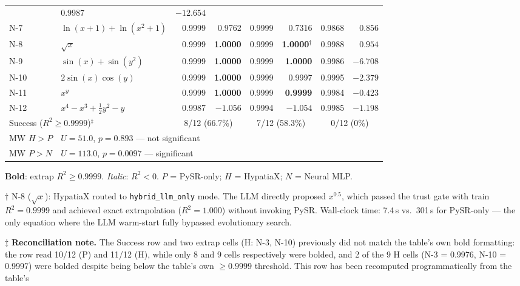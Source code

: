 \documentclass[twoside,11pt]{article}
\newcommand{\Rsq}{R^{2}}
\begin{document}
\begin{table}[h]
\begin{threeparttable}
\begin{tabular}{llrrrrrr}
  & 0.9987 & $-12.654$ \\
N-7  & $\ln(x+1)+\ln(x^2+1)$
  & 0.9999 & 0.9762
  & 0.9999 & 0.7316
  & 0.9868 & $0.856$ \\
N-8  & $\sqrt{x}$
  & 0.9999 & \textbf{1.0000}
  & 0.9999 & \textbf{1.0000}$^\dag$
  & 0.9988 & $0.954$ \\
N-9  & $\sin(x)+\sin(y^2)$
  & 0.9999 & \textbf{1.0000}
  & 0.9999 & \textbf{1.0000}
  & 0.9986 & $-6.708$ \\
N-10 & $2\sin(x)\cos(y)$
  & 0.9999 & \textbf{1.0000}
  & 0.9999 & 0.9997
  & 0.9995 & $-2.379$ \\
N-11 & $x^y$
  & 0.9999 & \textbf{1.0000}
  & 0.9999 & \textbf{0.9999}
  & 0.9984 & $-0.423$ \\
N-12 & $x^4 - x^3 + \tfrac{1}{2}y^2 - y$
  & 0.9987 & $-1.056$
  & 0.9994 & $-1.054$
  & 0.9985 & $-1.198$ \\
\midrule
\multicolumn{2}{l}{Success ($\Rsq\ge0.9999$)$^\ddag$}
  & \multicolumn{2}{c}{8/12 (66.7\%)}
  & \multicolumn{2}{c}{7/12 (58.3\%)}
  & \multicolumn{2}{c}{0/12 (0\%)} \\
MW $H>P$   & \multicolumn{7}{l}{$U=51.0$, $p=0.893$ — not significant} \\
MW $P>N$   & \multicolumn{7}{l}{$U=113.0$, $p=0.0097$ — significant} \\
\bottomrule
\end{tabular}
\begin{tablenotes}\small
  \item \textbf{Bold}: extrap $\Rsq \ge 0.9999$. \emph{Italic}: $\Rsq < 0$.
    $P$ = PySR-only; $H$ = HypatiaX; $N$ = Neural MLP.
  \item[$\dag$] N-8 ($\sqrt{x}$): HypatiaX routed to \texttt{hybrid\_llm\_only} mode.
    The LLM directly proposed $x^{0.5}$, which passed the trust gate with
    train $\Rsq = 0.9999$ and achieved exact extrapolation ($\Rsq = 1.000$)
    without invoking PySR. Wall-clock time: 7.4\,s vs.\ 301\,s for PySR-only ---
    the only equation where the LLM warm-start fully bypassed evolutionary search.
  \item[$\ddag$] \textbf{Reconciliation note.} The Success row and two extrap
    cells (H: N-3, N-10) previously did not match the table's own bold
    formatting: the row read 10/12 (P) and 11/12 (H), while only 8 and 9 cells
    respectively were bolded, and 2 of the 9 H cells (N-3 = 0.9976, N-10 =
    0.9997) were bolded despite being below the table's own $\ge 0.9999$
    threshold. This row has been recomputed programmatically from the table's

\end{tablenotes}
\end{threeparttable}
\end{table}
\end{document}

